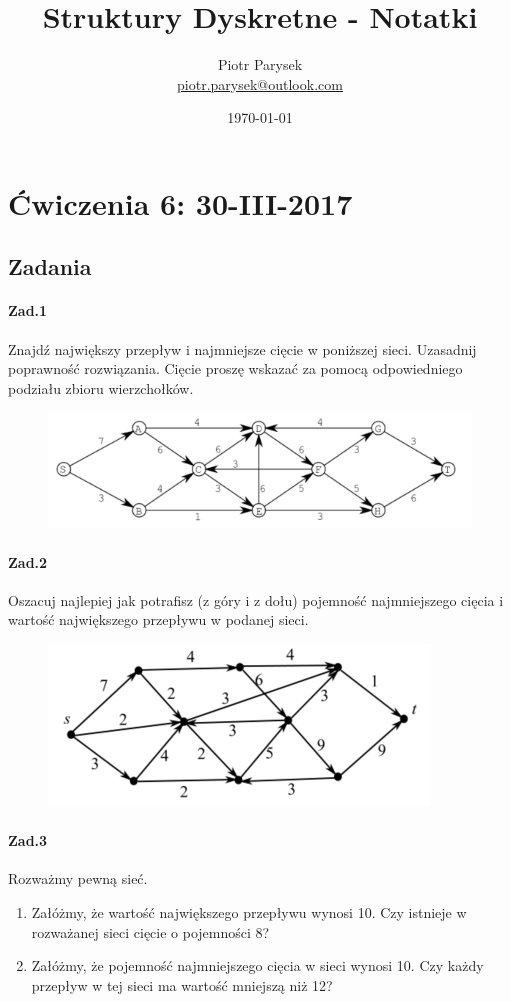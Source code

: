 \documentclass[a4paper,12pt]{article}
\title{Struktury Dyskretne - Notatki}
\author{Piotr Parysek\\
\href{mailto:piotr.parysek@outlook.com}{piotr.parysek@outlook.com} }
\date{\today}
\theoremstyle{definition}%
\theoremstyle{definition}
\theoremstyle{problem}
\begin{document}
\maketitle

\tableofcontents
\section{Ćwiczenia 6: 30-III-2017}
\subsection{Zadania}
\paragraph{Zad.1} Znajdź największy przepływ i najmniejsze cięcie w poniższej sieci. Uzasadnij poprawność rozwiązania. Cięcie proszę wskazać za pomocą odpowiedniego podziału zbioru wierzchołków.
\begin{figure}[H]
\centering
\includegraphics[width=.8\textwidth]{img/6_Z1}
\end{figure}

\paragraph{Zad.2} Oszacuj najlepiej jak potrafisz (z góry i z dołu) pojemność najmniejszego cięcia i wartość największego przepływu w podanej sieci.
\begin{figure}[H]
\centering
\includegraphics[width=.8\textwidth]{img/6_Z2}
\end{figure}

\paragraph{Zad.3} Rozważmy pewną sieć.
\begin{enumerate}[label=\alph*)]
\item Załóżmy, że wartość największego przepływu wynosi 10. Czy istnieje w rozważanej sieci cięcie o pojemności 8?
\item Załóżmy, że pojemność najmniejszego cięcia w sieci wynosi 10. Czy każdy przepływ w tej sieci ma wartość mniejszą niż 12?
\end{enumerate}
\end{document}
